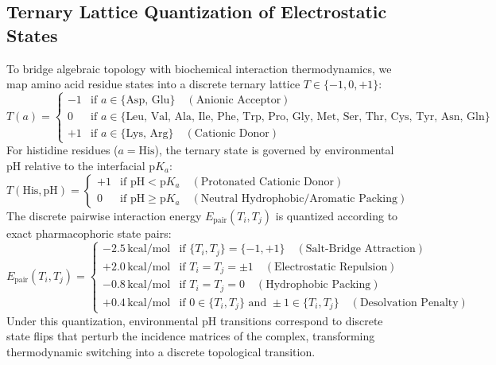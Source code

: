 \subsection{Ternary Lattice Quantization of Electrostatic States}
To bridge algebraic topology with biochemical interaction thermodynamics, we map amino acid residue states into a discrete ternary lattice $T \in \{-1, 0, +1\}$:
\begin{equation}
    T(a) = \begin{cases}
        -1 & \text{if } a \in \{\text{Asp, Glu}\} \quad (\text{Anionic Acceptor}) \\
        0  & \text{if } a \in \{\text{Leu, Val, Ala, Ile, Phe, Trp, Pro, Gly, Met, Ser, Thr, Cys, Tyr, Asn, Gln}\} \\
        +1 & \text{if } a \in \{\text{Lys, Arg}\} \quad (\text{Cationic Donor})
    \end{cases}
\end{equation}
For histidine residues ($a = \text{His}$), the ternary state is governed by environmental pH relative to the interfacial $\mathrm{p}K_a$:
\begin{equation}
    T(\text{His}, \text{pH}) = \begin{cases}
        +1 & \text{if } \text{pH} < \mathrm{p}K_a \quad (\text{Protonated Cationic Donor}) \\
        0  & \text{if } \text{pH} \ge \mathrm{p}K_a \quad (\text{Neutral Hydrophobic/Aromatic Packing})
    \end{cases}
\end{equation}
The discrete pairwise interaction energy $E_{\text{pair}}(T_i, T_j)$ is quantized according to exact pharmacophoric state pairs:
\begin{equation}
    E_{\text{pair}}(T_i, T_j) = \begin{cases}
        -2.5\,\text{kcal/mol} & \text{if } \{T_i, T_j\} = \{-1, +1\} \quad (\text{Salt-Bridge Attraction}) \\
        +2.0\,\text{kcal/mol} & \text{if } T_i = T_j = \pm 1 \quad (\text{Electrostatic Repulsion}) \\
        -0.8\,\text{kcal/mol} & \text{if } T_i = T_j = 0 \quad (\text{Hydrophobic Packing}) \\
        +0.4\,\text{kcal/mol} & \text{if } 0 \in \{T_i, T_j\} \text{ and } \pm 1 \in \{T_i, T_j\} \quad (\text{Desolvation Penalty})
    \end{cases}
\end{equation}
Under this quantization, environmental pH transitions correspond to discrete state flips that perturb the incidence matrices of the complex, transforming thermodynamic switching into a discrete topological transition.

